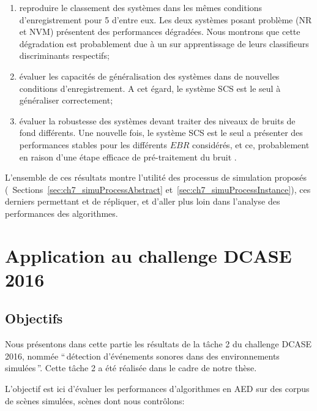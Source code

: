 \begin{enumerate}
\item reproduire le classement des systèmes dans les mêmes conditions d'enregistrement pour 5 d'entre eux. Les deux systèmes posant problème (NR et NVM) présentent des performances dégradées. Nous montrons que cette dégradation est probablement due à un sur apprentissage de leurs classifieurs discriminants respectifs;
\item évaluer les capacités de généralisation des systèmes dans de nouvelles conditions d'enregistrement. A cet égard, le système SCS est le seul à généraliser correctement;
\item évaluer la robustesse des systèmes devant traiter des niveaux de bruits de fond différents. Une nouvelle fois, le système SCS est le seul a présenter des performances stables pour les différents $EBR$ considérés, et ce, probablement en raison d'une étape efficace de pré-traitement du bruit .
\end{enumerate}

L'ensemble de ces résultats montre l'utilité des processus de simulation proposés (\cf~Sections~\ref{sec:ch7_simuProcessAbstract} et~\ref{sec:ch7_simuProcessInstance}), ces derniers permettant et de répliquer, et d'aller plus loin dans l'analyse des performances des algorithmes.


\section{Application au challenge DCASE  2016}
\label{sec:ch5_appDcase2016}

\subsection{Objectifs}

Nous présentons dans cette partie les résultats de la tâche 2 du challenge DCASE 2016, nommée ``\,détection d'événements sonores dans des environnements simulées\,''. Cette tâche 2 a été réalisée dans le cadre de notre thèse. 

L'objectif est ici d'évaluer les performances d'algorithmes en AED sur des corpus de scènes simulées, scènes dont nous contrôlons:

